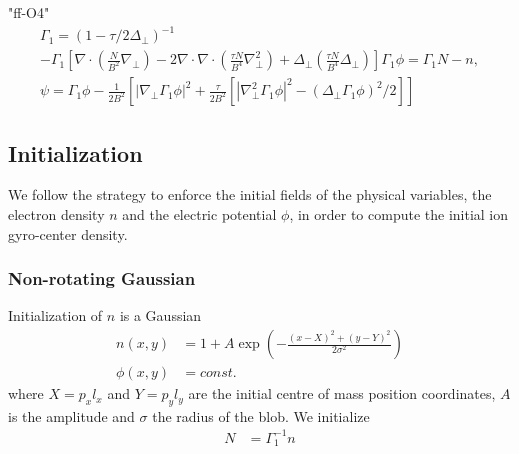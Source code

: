 "ff-O4"
\begin{subequations}
\begin{align}
\Gamma_1 = (1- \tau/2\Delta_{\perp})^{-1}\\
 -\Gamma_1 \left[\nabla\cdot \left(\frac{N}{B^2} \nabla_\perp\right)-2   \nabla\cdot\nabla\cdot \left(\frac{\tau N}{B^4} \nabla_\perp^2\right)+  \Delta_{\perp} \left(\frac{\tau N}{B^4} \Delta_{\perp}\right)\right]\Gamma_1 \phi = \Gamma_1 N-n,  \\
\psi = \Gamma_1 \phi - \frac{1}{2 B^2} \left[|\nabla_\perp \Gamma_1\phi|^2 + \frac{\tau}{2 B^2} \left[|\nabla_\perp^2 \Gamma_1\phi |^2 - (\Delta_{\perp} \Gamma_1\phi)^2 /2 \right]\right]
\end{align}
\end{subequations}

\subsection{Initialization}
We follow the strategy to enforce the initial fields of the physical variables, the electron density \(n\) and the electric potential \(\phi\), in order to compute the initial ion gyro-center density.
\subsubsection{Non-rotating Gaussian}
Initialization of $n$ is a Gaussian 
\begin{align}
    n(x,y) &= 1 + A\exp\left( -\frac{(x-X)^2 + (y-Y)^2}{2\sigma^2}\right) \\
    \phi(x,y)&=const.
\end{align}
where $X = p_x l_x$ and $Y=p_yl_y$ are the initial centre of mass position coordinates, $A$ is the amplitude and $\sigma$ the
radius of the blob.
We initialize 
\begin{align}
    N &= \Gamma_1^{-1} n 
\end{align}
